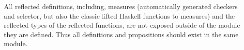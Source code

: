 All reflected definitions, 
including, measures (automatically generated checkers and selector, 
but also the classic lifted Haskell functions to measures) 
and the reflected types of the reflected functions, 
are not exposed outside of the module they are defined. 
%
Thus all definitions and propositions should exist in the same module. 
